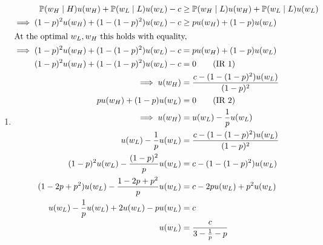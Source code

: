 \begin{enumerate}[label=\alph*)]
\item
  \begin{align*}
    \p(w_H \mid H) u(w_H) + \p(w_L \mid L) u(w_L) - c &\ge \p(w_H \mid L) u(w_H) + \p (w_L \mid L) u(w_L)\\
    \implies (1 - p)^2 u(w_H) + (1 - (1 - p)^2) u(w_L) - c &\ge p u(w_H) + (1 - p) u (w_L)\\
    \intertext{At the optimal $w_L, w_H$ this holds with equality,}
    \implies (1 - p)^2 u(w_H) + (1 - (1 - p)^2) u(w_L) - c &= p u(w_H) + (1 - p) u (w_L)\\
    (1 - p)^2 u(w_H) + (1 - (1 - p)^2) u(w_L) - c &= 0 \tag{IR 1}\\
    \implies u(w_H) &= \frac{c - (1 - (1 - p)^2) u(w_L)}{(1 - p)^2}\\
    pu(w_H) + (1 - p) u(w_L) &= 0\tag{IR 2}\\
    \implies u(w_H) &= u(w_L) - \frac{1}{p} u(w_L)\\
    u(w_L) - \frac{1}{p} u(w_L) &= \frac{c - (1 - (1 - p)^2) u(w_L)}{(1 - p)^2}\\
    (1 - p)^2 u(w_L) - \frac{(1 - p)^2}{p} u(w_L) &= c - (1 - (1 - p)^2) u(w_L)\\
    (1 - 2p + p^2) u(w_L) - \frac{1 - 2p + p^2}{p} u(w_L) &= c - 2pu(w_L) + p^2 u(w_L)\\
    u(w_L) - \frac{1}{p} u(w_L) + 2u(w_L) - pu(w_L) &= c\\
    u(w_L) &= \frac{c}{3 - \frac{1}{p} - p}\\

\end{align*}
\end{enumerate}
